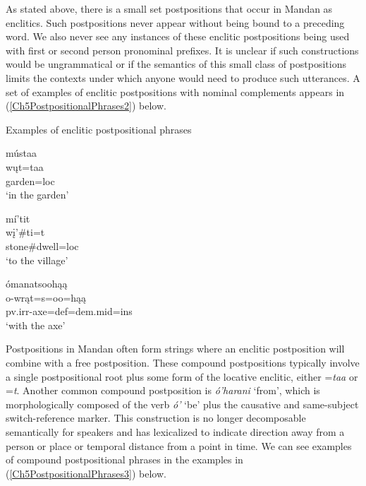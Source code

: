 As stated above, there is a small set postpositions that occur in Mandan as enclitics. Such postpositions never appear without being bound to a preceding word. We also never see any instances of these enclitic postpositions being used with first or second person pronominal prefixes. It is unclear if such constructions would be ungrammatical or if the semantics of this small class of postpositions limits the contexts under which anyone would need to produce such utterances. A set of examples of enclitic postpositions with nominal complements appears in (\ref{Ch5PostpositionalPhrases2}) below.

\newpage

\begin{exe}

\item\label{Ch5PostpositionalPhrases2} Examples of enclitic postpositional phrases

    \begin{xlist}
        \item\label{Ch5PostpositionalPhrases2A} \glll mústaa\\
        wųt=taa\\
        \textnormal{garden}=loc\\
        \glt `in the garden' \citep[84]{hollow1973a}

        \item\label{Ch5PostpositionalPhrases2B} \glll mí'tit\\
        wį'\#ti=t\\
        \textnormal{stone}\#\textnormal{dwell}=loc\\
        \glt `to the village' \citep[107]{hollow1973a}

        \item\label{Ch5PostpositionalPhrases2C} \glll ómanatsoohąą\\
        o-wrąt=s=oo=hąą\\
        pv.irr-\textnormal{axe}=def=dem.mid=ins\\
        \glt `with the axe' \citep[25]
        {kennard1936}
    \end{xlist}

\end{exe}

Postpositions in Mandan often form strings where an enclitic postposition will combine with a free postposition. These compound postpositions typically involve a single postpositional root plus some form of the locative enclitic, either =\textit{taa} or =\textit{t}. Another common compound postposition is \textit{ó'harani} `from', which is morphologically composed of the verb \textit{ó'} `be' plus the causative and same-subject switch-reference marker. This construction is no longer decomposable semantically for speakers and has lexicalized to indicate direction away from a person or place or temporal distance from a point in time.  We can see examples of compound postpositional phrases in the examples in (\ref{Ch5PostpositionalPhrases3}) below.

